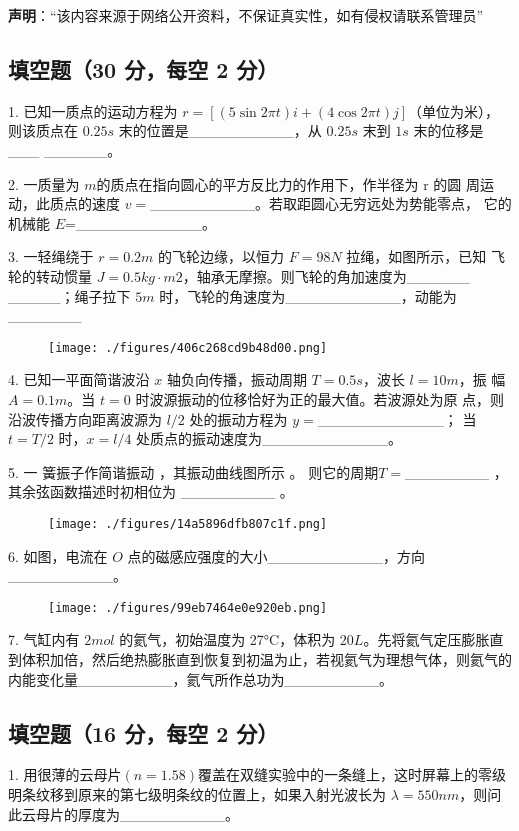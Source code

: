 
\textbf{声明}：“该内容来源于网络公开资料，不保证真实性，如有侵权请联系管理员”

\subsection{填空题（30 分，每空 2 分）}
1. 已知一质点的运动方程为 $r=\left[(5\sin2\pi t)i+(4\cos2\pi t)j\right]$（单位为米），则该质点在 $0.25s$ 末的位置是__________，从 $0.25s$ 末到 $1s$ 末的位移是___
______。

2. 一质量为 $m$的质点在指向圆心的平方反比力的作用下，作半径为 r 的圆
周运动，此质点的速度 $v=$__________。若取距圆心无穷远处为势能零点，
它的机械能 $E$=____________。

3. 一轻绳绕于 $r=0.2m$ 的飞轮边缘，以恒力 $F=98N$ 拉绳，如图所示，已知
飞轮的转动惯量 $J=0.5kg\cdot m2$，轴承无摩擦。则飞轮的角加速度为______
_____；绳子拉下 $5m$ 时，飞轮的角速度为___________，动能为_______
\begin{figure}[ht]
\centering
\texttt{[image: ./figures/406c268cd9b48d00.png]}
\caption{} \label{fig_NJUD2_1}
\end{figure}
4. 已知一平面简谐波沿 $x$ 轴负向传播，振动周期 $T=0.5s$，波长 $l=10m$，振
幅 $A=0.1m$。当 $t=0$ 时波源振动的位移恰好为正的最大值。若波源处为原
点，则沿波传播方向距离波源为 $l/2$ 处的振动方程为 $y=$____________；
当 $t=T/2$ 时，$x=l/4$ 处质点的振动速度为____________。

5. 一 簧振子作简谐振动 ，其振动曲线图所示 。 则它的周期$T=$________ ， 其余弦函数描述时初相位为 _________ 。
\begin{figure}[ht]
\centering
\texttt{[image: ./figures/14a5896dfb807c1f.png]}
\caption{} \label{fig_NJUD2_2}
\end{figure}
6. 如图，电流在 $O$ 点的磁感应强度的大小___________，方向__________。
\begin{figure}[ht]
\centering
\texttt{[image: ./figures/99eb7464e0e920eb.png]}
\caption{} \label{fig_NJUD2_3}
\end{figure}
7. 气缸内有 $2mol$ 的氦气，初始温度为 27°C，体积为 $20L$。先将氦气定压膨胀直到体积加倍，然后绝热膨胀直到恢复到初温为止，若视氦气为理想气体，则氦气的内能变化量_________，氦气所作总功为_________。
\subsection{填空题（16 分，每空 2 分）}
1. 用很薄的云母片$(n=1.58)$覆盖在双缝实验中的一条缝上，这时屏幕上的零级明条纹移到原来的第七级明条纹的位置上，如果入射光波长为 $\lambda=550nm$，则问此云母片的厚度为__________。

